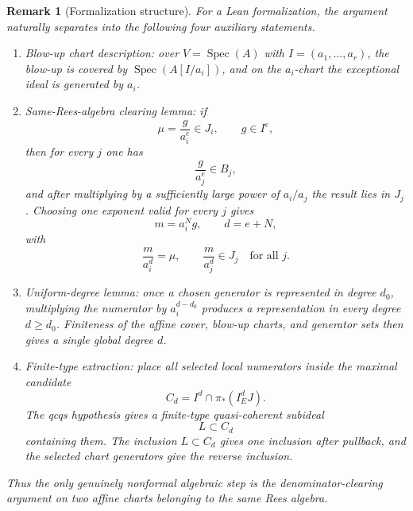 \documentclass[11pt]{article}
\newtheorem{remark}{Remark}
\newcommand{\Spec}{\operatorname{Spec}}
\begin{document}
\begin{remark}[Formalization structure]
For a Lean formalization, the argument naturally separates into the following
four auxiliary statements.

\begin{enumerate}[label=\arabic*.]
  \item
  \emph{Blow-up chart description:}
  over $V=\Spec(A)$ with $I=(a_1,\dots,a_r)$, the blow-up is covered by
  $\Spec(A[I/a_i])$, and on the $a_i$-chart the exceptional ideal is
  generated by $a_i$.

  \item
  \emph{Same-Rees-algebra clearing lemma:}
  if
  \[
    \mu=\frac{g}{a_i^e}\in J_i,
    \qquad g\in I^e,
  \]
  then for every $j$ one has
  \[
    \frac{g}{a_j^e}\in B_j,
  \]
  and after multiplying by a sufficiently large power of $a_i/a_j$ the
  result lies in $J_j$.
  Choosing one exponent valid for every $j$ gives
  \[
    m=a_i^Ng,\qquad d=e+N,
  \]
  with
  \[
    \frac{m}{a_i^d}=\mu,
    \qquad
    \frac{m}{a_j^d}\in J_j
    \quad\text{for all }j.
  \]

  \item
  \emph{Uniform-degree lemma:}
  once a chosen generator is represented in degree $d_0$, multiplying the
  numerator by $a_i^{d-d_0}$ produces a representation in every degree
  $d\geq d_0$.
  Finiteness of the affine cover, blow-up charts, and generator sets then
  gives a single global degree $d$.

  \item
  \emph{Finite-type extraction:}
  place all selected local numerators inside the maximal candidate
  \[
    C_d
    =
    I^d\cap \pi_*(I_E^dJ).
  \]
  The qcqs hypothesis gives a finite-type quasi-coherent subideal
  \[
    L\subset C_d
  \]
  containing them.
  The inclusion $L\subset C_d$ gives one inclusion after pullback, and the
  selected chart generators give the reverse inclusion.
\end{enumerate}

Thus the only genuinely nonformal algebraic step is the denominator-clearing
argument on two affine charts belonging to the same Rees algebra.
\end{remark}
\end{document}
